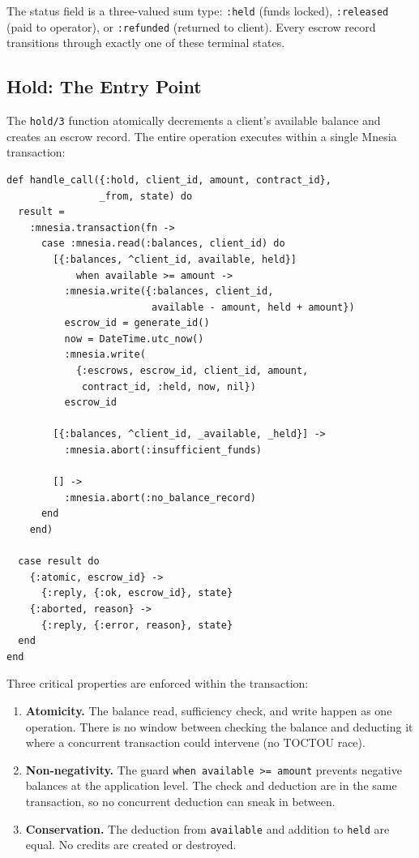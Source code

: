 \documentclass[12pt,a4paper]{article}
\theoremstyle{plain}
\theoremstyle{definition}
\begin{document}
The status field is a three-valued sum type: \texttt{:held} (funds locked), \texttt{:released} (paid to operator), or \texttt{:refunded} (returned to client). Every escrow record transitions through exactly one of these terminal states.

\subsection{Hold: The Entry Point}

The \texttt{hold/3} function atomically decrements a client's available balance and creates an escrow record. The entire operation executes within a single Mnesia transaction:

\begin{lstlisting}[caption={Atomic escrow hold via Mnesia transaction},label={lst:escrow-hold}]
def handle_call({:hold, client_id, amount, contract_id},
                _from, state) do
  result =
    :mnesia.transaction(fn ->
      case :mnesia.read(:balances, client_id) do
        [{:balances, ^client_id, available, held}]
            when available >= amount ->
          :mnesia.write({:balances, client_id,
                         available - amount, held + amount})
          escrow_id = generate_id()
          now = DateTime.utc_now()
          :mnesia.write(
            {:escrows, escrow_id, client_id, amount,
             contract_id, :held, now, nil})
          escrow_id

        [{:balances, ^client_id, _available, _held}] ->
          :mnesia.abort(:insufficient_funds)

        [] ->
          :mnesia.abort(:no_balance_record)
      end
    end)

  case result do
    {:atomic, escrow_id} ->
      {:reply, {:ok, escrow_id}, state}
    {:aborted, reason} ->
      {:reply, {:error, reason}, state}
  end
end
\end{lstlisting}

Three critical properties are enforced within the transaction:

\begin{enumerate}
    \item \textbf{Atomicity.} The balance read, sufficiency check, and write happen as one operation. There is no window between checking the balance and deducting it where a concurrent transaction could intervene (no TOCTOU race).
    \item \textbf{Non-negativity.} The guard \texttt{when available >= amount} prevents negative balances at the application level. The check and deduction are in the same transaction, so no concurrent deduction can sneak in between.
    \item \textbf{Conservation.} The deduction from \texttt{available} and addition to \texttt{held} are equal. No credits are created or destroyed.
\end{enumerate}
\end{document}
